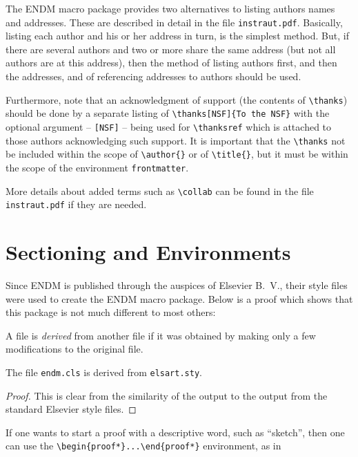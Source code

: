 \documentclass{endm}
\begin{document}
The ENDM macro package provides two alternatives to listing authors
names and addresses. These are described in detail in the file
\texttt{instraut.pdf}. Basically, listing each author and his or her
address in turn, is the simplest method. But, if there are several
authors and two or more share the same address (but not all authors
are at this address), then the method of listing authors first, and
then the addresses, and of referencing addresses to authors should be
used.

Furthermore, note that an acknowledgment of support (the contents of
\verb+\thanks+) should be done by a separate listing of
\verb+\thanks[NSF]{To the NSF}+ with the optional argument --
\verb+[NSF]+ -- being used for \verb+\thanksref+ which is attached to
those authors acknowledging such support. It is important that the
\verb+\thanks+ not be included within the scope of \verb+\author{}+ or
of \verb+\title{}+, but it must be within the scope of the environment
\texttt{frontmatter}.

More details about added terms such as \verb+\collab+ can be found in
the file \texttt{instraut.pdf} if they are needed.


\section{Sectioning and Environments}

Since ENDM is published through the auspices of Elsevier B.~V., their
style files were used to create the ENDM macro package. Below is a
proof which shows that this package is not much different to most
others:

\begin{definition}
A file is \emph{derived} from another file if it was obtained by making
only a few modifications to the original file.
\end{definition}

\begin{theorem}
The file \texttt{\normalshape endm.cls} is derived from
\texttt{\normalshape elsart.sty}.
\end{theorem}

\begin{proof}
This is clear from the similarity of the output to the output from the
standard Elsevier style files.
\end{proof}

If one wants to start a proof with a descriptive word, such as
``sketch'', then one can use the \verb+\begin{proof*}...\end{proof*}+
environment, as in
\end{document}
